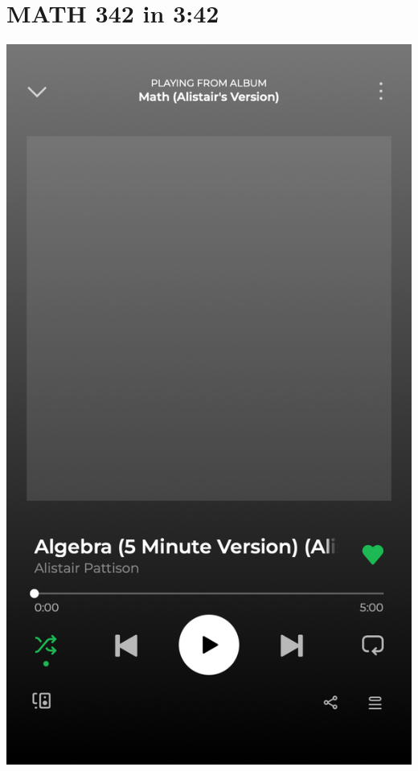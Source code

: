 \section{MATH 342 in 3:42}

\begin{frame}
	\begin{center}

		\includegraphics[height=.7\textheight]{images/math-342-alistairs-version.jpg}
	\end{center}
\end{frame}

